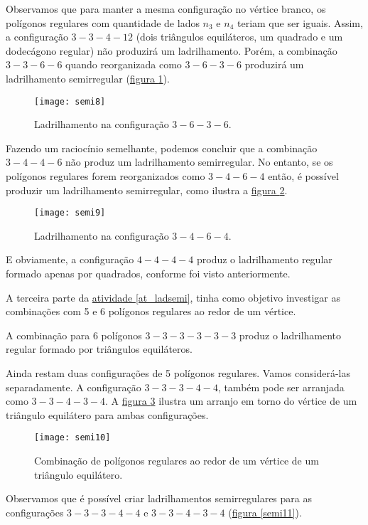 Observamos que para manter a mesma configuração no vértice branco, os polígonos regulares com quantidade de lados  $n_3$  e $n_4$ teriam que ser iguais. Assim, a configuração $3-3-4-12$ (dois triângulos equiláteros, um quadrado e um dodecágono regular) não produzirá um ladrilhamento. Porém, a combinação $3-3-6-6$ quando reorganizada como $3-6-3-6$ produzirá um ladrilhamento semirregular (\hyperref[semi8]{figura \ref{semi8}}).



\begin{figure}[H]
\centering
\texttt{[image: semi8]}
\caption{Ladrilhamento na configuração $3-6-3-6$.}
\label{semi8}
\end{figure}

Fazendo um raciocínio semelhante, podemos concluir que a combinação $3-4-4-6$ não produz um ladrilhamento semirregular. No entanto, se os polígonos regulares forem reorganizados como $3-4-6-4$ então, é possível produzir um ladrilhamento semirregular, como ilustra a \hyperref[semi9]{figura \ref{semi9}}.

\begin{figure}[H]
\centering
\texttt{[image: semi9]}
\caption{Ladrilhamento na configuração $3-4-6-4$.}
\label{semi9}
\end{figure}


E obviamente, a configuração $4-4-4-4$ produz o ladrilhamento regular formado apenas por quadrados, conforme foi visto anteriormente.

A terceira parte da \hyperref[at_ladsemi]{atividade \ref{at_ladsemi}}, tinha como objetivo investigar as combinações com 5 e 6 polígonos regulares ao redor de um vértice.

A combinação para 6 polígonos $3-3-3-3-3-3$ produz o ladrilhamento regular formado por triângulos equiláteros.

Ainda restam duas configurações de 5 polígonos regulares. Vamos  considerá-las separadamente. A configuração $3-3-3-4-4$, também pode ser arranjada como  $3-3- 4-3-4$. A \hyperref[semi10]{figura \ref{semi10}} ilustra um arranjo em torno do vértice de um triângulo equilátero para ambas configurações.

\begin{figure}[H]
\centering
\texttt{[image: semi10]}
\caption{Combinação de polígonos regulares ao redor de um vértice de um triângulo equilátero.}
\label{semi10}
\end{figure}

Observamos que é possível criar ladrilhamentos semirregulares para as configurações  $3-3-3-4-4$ e $3-3-4-3-4$ (\hyperref[semi11]{figura \ref{semi11}}).

